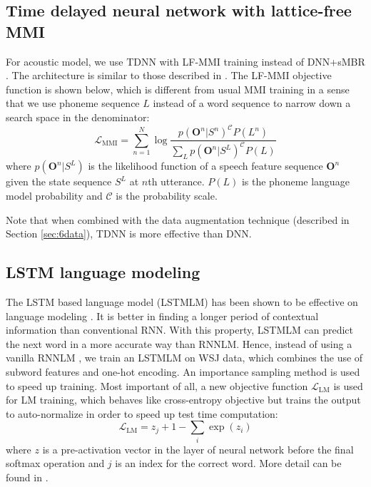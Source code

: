 \documentclass[a4paper]{article}
\begin{document}
\subsection{Time delayed neural network with lattice-free MMI}
\label{sec:tdnn}
For acoustic model, we use TDNN with LF-MMI training \cite{povey2016purely} instead of DNN+sMBR \cite{vesely2013sequence}. 
The architecture is similar to those described in \cite{peddinti2015time}. 
The LF-MMI objective function is shown below, which is different from usual MMI training \cite{povey2005discriminative} in a sense that we use phoneme sequence $L$ instead of a word sequence to narrow down a search space in the denominator:
\begin{equation}
 \mathcal{L}_{\text{MMI}} = \sum ^{N}_{n=1} \log \frac{p(\mathbf{O} ^{n} | S ^{n})^{\mathcal{C}} P(L ^{n})}{\sum _{L} p(\mathbf{O} ^{n} | S ^{L})^{\mathcal{C}} P(L) }
\end{equation}
where $p(\mathbf{O} ^{n} | S ^{L})$ is the likelihood function of a speech feature sequence $\mathbf{O} ^{n}$ given the state sequence $S ^L$ at $n$\textquotesingle th utterance. 
$P(L)$ is the phoneme language model probability and $\mathcal{C}$ is the probability scale.

Note that when combined with the data augmentation technique (described in Section \ref{sec:6data}), TDNN is more effective than DNN.

\subsection{LSTM language modeling}
\label{sec:lstm}
The LSTM based language model (LSTMLM) has been shown to be effective on language modeling \cite{sundermeyer2012lstm}. It is better in finding a longer period of contextual information than conventional RNN. With this property, LSTMLM can predict the next word in a more accurate way than RNNLM. Hence, instead of using a vanilla RNNLM \cite{mikolov2010recurrent}, we train an LSTMLM on WSJ data, which combines the use of subword features and one-hot encoding. An importance sampling method is used to speed up training.
Most important of all, a new objective function $\mathcal{L}_{\text{LM}}$ is used for LM training, 
which behaves like cross-entropy objective but trains
the output to auto-normalize in order to speed up test time
computation:
\begin{equation}
\mathcal{L}_{\text{LM}} = z_{j} + 1 - \sum_{i} \exp (z_{i})
\end{equation}
where $z$ is a pre-activation vector in the layer of neural network before the final softmax operation and $j$ is an index for the correct word.
More detail can be found in \cite{xuneural}.
\end{document}
